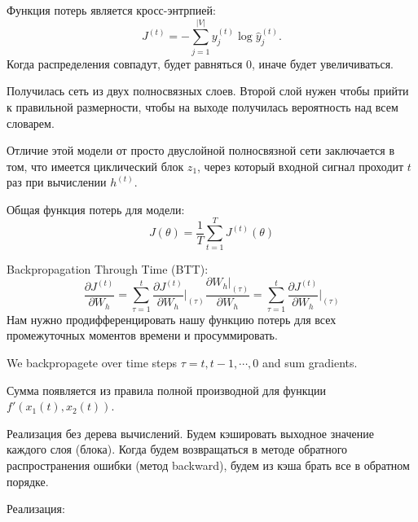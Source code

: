 Функция потерь является кросс-энтрпией:
\[
    J^{(t)} = - \sum_{j=1}^{|V|} y_j^{(t)} \log \hat y_j^{(t)}. 
\]
Когда распределения совпадут, будет равняться 0, иначе будет увеличиваться.

Получилась сеть из двух полносвязных слоев. Второй слой нужен чтобы прийти к
правильной размерности, чтобы на выходе получилась вероятность над всем
словарем.

Отличие этой модели от просто двуслойной полносвязной сети заключается в том,
что имеется циклический блок $z_1$, через который входной сигнал
проходит $t$ раз при вычислении $h^{(t)}$.

Общая функция потерь для модели:
\[
    J(\theta) = \frac{1}{T}\sum_{t=1}^{T}J^{(t)}(\theta)
\]

Backpropagation Through Time (BTT):
\[
    \frac{\partial J^{(t)}}{\partial W_h} = \sum_{\tau = 1}^{t} \frac{\partial
J^{(t)}}{\partial W_h} \Bigg\rvert_{(\tau)} \frac{\partial W_h
\rvert_{(\tau)}}{\partial W_h} = \sum_{\tau =1}^{t} \frac{\partial
J^{(t)}}{\partial W_h} \Bigg\rvert_{(\tau)}
\]
Нам нужно продифференцировать нашу функцию потерь для всех промежуточных
моментов времени и просуммировать.

We backpropagete over time steps $\tau = t, t - 1, \cdots, 0$ and sum
gradients.

Сумма появляется из правила полной производной для функции $f'(x_1(t), x_2(t))$.

Реализация без дерева вычислений. Будем кэшировать выходное значение каждого
слоя (блока). Когда будем возвращаться в методе обратного распространения
ошибки (метод backward), будем из кэша брать все в обратном порядке.

Реализация:





